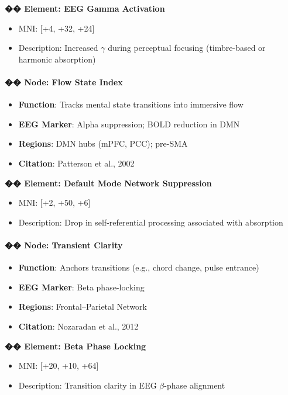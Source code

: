 \textbf{�� Element: EEG Gamma Activation}

\begin{itemize}
    \item MNI: [+4, +32, +24]
    \item Description: Increased $\gamma$ during perceptual focusing (timbre-based or harmonic absorption)
\end{itemize}

\paragraph{�� Node: Flow State Index}

\begin{itemize}
    \item \textbf{Function}: Tracks mental state transitions into immersive flow
    \item \textbf{EEG Marker}: Alpha suppression; BOLD reduction in DMN
    \item \textbf{Regions}: DMN hubs (mPFC, PCC); pre-SMA
    \item \textbf{Citation}: Patterson et al., 2002
\end{itemize}

\textbf{�� Element: Default Mode Network Suppression}

\begin{itemize}
    \item MNI: [+2, +50, +6]
    \item Description: Drop in self-referential processing associated with absorption
\end{itemize}

\paragraph{�� Node: Transient Clarity}

\begin{itemize}
    \item \textbf{Function}: Anchors transitions (e.g., chord change, pulse entrance)
    \item \textbf{EEG Marker}: Beta phase-locking
    \item \textbf{Regions}: Frontal–Parietal Network
    \item \textbf{Citation}: Nozaradan et al., 2012
\end{itemize}

\textbf{�� Element: Beta Phase Locking}

\begin{itemize}
    \item MNI: [+20, +10, +64]
    \item Description: Transition clarity in EEG $\beta$-phase alignment
\end{itemize}

